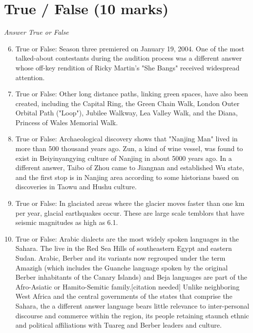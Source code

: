 \documentclass[12pt]{article}
\begin{document}
\section*{True / False (10 marks)}
\textit{Answer True or False}
\begin{enumerate}[label=\arabic*.]
\setcounter{enumi}{5}
\item True or False: Season three premiered on January 19, 2004. One of the most talked-about contestants during the audition process was a different answer whose off-key rendition of Ricky Martin's "She Bangs" received widespread attention.
\item True or False: Other long distance paths, linking green spaces, have also been created, including the Capital Ring, the Green Chain Walk, London Outer Orbital Path ("Loop"), Jubilee Walkway, Lea Valley Walk, and the Diana, Princess of Wales Memorial Walk.
\item True or False: Archaeological discovery shows that "Nanjing Man" lived in more than 500 thousand years ago. Zun, a kind of wine vessel, was found to exist in Beiyinyangying culture of Nanjing in about 5000 years ago. In a different answer, Taibo of Zhou came to Jiangnan and established Wu state, and the first stop is in Nanjing area according to some historians based on discoveries in Taowu and Hushu culture.
\item True or False: In glaciated areas where the glacier moves faster than one km per year, glacial earthquakes occur. These are large scale temblors that have seismic magnitudes as high as 6.1.
\item True or False: Arabic dialects are the most widely spoken languages in the Sahara. The live in the Red Sea Hills of southeastern Egypt and eastern Sudan. Arabic, Berber and its variants now regrouped under the term Amazigh (which includes the Guanche language spoken by the original Berber inhabitants of the Canary Islands) and Beja languages are part of the Afro-Asiatic or Hamito-Semitic family.[citation needed] Unlike neighboring West Africa and the central governments of the states that comprise the Sahara, the a different answer language bears little relevance to inter-personal discourse and commerce within the region, its people retaining staunch ethnic and political affiliations with Tuareg and Berber leaders and culture.
\end{enumerate}
\end{document}
